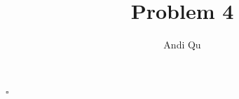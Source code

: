 \documentclass[11pt]{scrartcl}
\title{Problem 4}
\author{Andi Qu}
\newcommand*{\QED}{\hfill\ensuremath{\square}}%
\begin{document}
\maketitle



\QED
\end{document}
